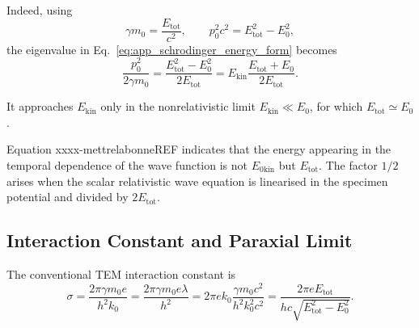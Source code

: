 Indeed, using
\begin{equation}
\gamma m_0=\frac{E_{\mathrm{tot}}}{c^2},
\qquad
p_0^2c^2=E_{\mathrm{tot}}^2-E_0^2,
\end{equation}
the eigenvalue in Eq.~\eqref{eq:app_schrodinger_energy_form} becomes
\begin{equation}
\frac{p_0^2}{2\gamma m_0}
=
\frac{E_{\mathrm{tot}}^2-E_0^2}{2E_{\mathrm{tot}}}
=
E_{\mathrm{kin}}\frac{E_{\mathrm{tot}}+E_0}{2E_{\mathrm{tot}}}.
\label{eq:app_effective_schrodinger_eigenvalue}
\end{equation}

It approaches $E_{\mathrm{kin}}$ only in the nonrelativistic limit
$E_{\mathrm{kin}}\ll E_0$, for which $E_{\mathrm{tot}}\simeq E_0$.

Equation  xxxx-mettrelabonneREF indicates that the energy appearing in the temporal dependence of the wave function is not $E_{0\mathrm{kin}}$ but $E_{\mathrm{tot}}$. 
The factor $1/2$ arises when the scalar relativistic wave equation is
linearised in the specimen potential and divided by
$2E_{\mathrm{tot}}$. 

\subsection{Interaction Constant and Paraxial Limit}

The conventional TEM interaction constant is
\begin{equation}
\sigma
=
\frac{2\pi\gamma m_0e}{h^2k_0}
=
\frac{2\pi\gamma m_0e\lambda}{h^2}= 2 \pi e  k_0 \frac{\gamma m_0 c^2}{h^2 k_0^2 c^2}=
\frac{2\pi e E_{\mathrm{tot}}}
{hc\sqrt{E_{\mathrm{tot}}^2-E_0^2}}.
\label{eq:app_sigma_definition}
\end{equation}

